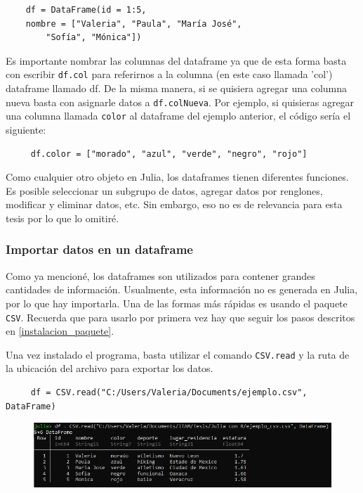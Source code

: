 \begin{verbatim}
    df = DataFrame(id = 1:5, 
    nombre = ["Valeria", "Paula", "María José", 
        "Sofía", "Mónica"])
\end{verbatim}

Es importante nombrar las columnas del dataframe ya que de esta forma basta con escribir \texttt{df.col} para referirnos a la columna (en este caso llamada 'col') dataframe llamado df. De la misma manera, si se quisiera agregar una columna nueva basta con asignarle datos a \texttt{df.colNueva}. Por ejemplo, si quisieras agregar una columna llamada \texttt{color} al dataframe del ejemplo anterior, el código sería el siguiente: 

\begin{verbatim}
     df.color = ["morado", "azul", "verde", "negro", "rojo"]
\end{verbatim}

Como cualquier otro objeto en Julia, los dataframes tienen diferentes funciones. Es posible seleccionar un subgrupo de datos, agregar datos por renglones, modificar y eliminar datos, etc. Sin embargo, eso no es de relevancia para esta tesis por lo que lo omitiré.

\subsubsection{Importar datos en un dataframe}

Como ya mencioné, los dataframes son utilizados para contener grandes cantidades de información. Usualmente, esta información no es generada en Julia, por lo que hay importarla. Una de las formas más rápidas es usando el paquete \texttt{CSV}. Recuerda que para usarlo por primera vez hay que seguir los pasos descritos en \ref{instalacion_paquete}. 

Una vez instalado el programa, basta utilizar el comando \texttt{CSV.read} y la ruta de la ubicación del archivo para exportar los datos. 

\begin{verbatim}
     df = CSV.read("C:/Users/Valeria/Documents/ejemplo.csv", DataFrame)
\end{verbatim}


\begin{figure}[h]
\begin{center}
\includegraphics[scale=0.6]{Imagenes/insertar_df.JPG}
  \label{insertar_df}
\end{center}
\end{figure}

